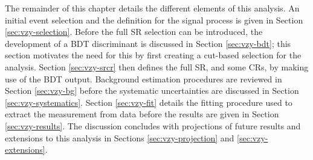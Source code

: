 The remainder of this chapter details the different elements of this analysis.
An initial event selection and the definition for the signal process is given in
Section \ref{sec:vzy-selection}. Before the full \ac{SR} selection can be
introduced, the development of a \ac{BDT} discriminant is discussed in Section
\ref{sec:vzy-bdt}; this section motivates the need for this by first creating a
cut-based selection for the analysis. Section \ref{sec:vzy-srcr} then defines
the full \ac{SR}, and some \acp{CR}, by making use of the \ac{BDT} output.
Background estimation procedures are reviewed in Section \ref{sec:vzy-bg} before
the systematic uncertainties are discussed in Section \ref{sec:vzy-systematics}.
Section \ref{sec:vzy-fit} details the fitting procedure used to extract the
measurement from data before the results are given in Section
\ref{sec:vzy-results}. The discussion concludes with projections of future
results and extensions to this analysis in Sections \ref{sec:vzy-projection} and
\ref{sec:vzy-extensions}.


